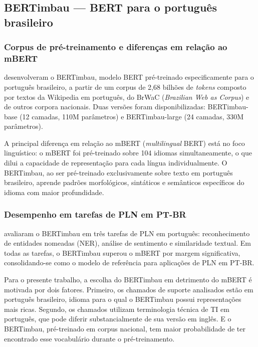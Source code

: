 \documentclass[
    12pt,                %
    openright,           %
    oneside,             %
    a4paper,             %
    english,             %
    brazil               %
]{abntex2}
\begin{document}
\subsection{BERTimbau — BERT para o português brasileiro}
\label{subsec:bertimbau}

\subsubsection{Corpus de pré-treinamento e diferenças em relação ao mBERT}
\label{subsubsec:bertimbau_corpus}

 desenvolveram o BERTimbau, modelo BERT pré-treinado especificamente para o português brasileiro, a partir de um corpus de 2,68 bilhões de \textit{tokens} composto por textos da Wikipedia em português, do BrWaC (\textit{Brazilian Web as Corpus}) e de outros corpora nacionais. Duas versões foram disponibilizadas: BERTimbau-base (12 camadas, 110M parâmetros) e BERTimbau-large (24 camadas, 330M parâmetros).

A principal diferença em relação ao mBERT (\textit{multilingual} BERT) está no foco linguístico: o mBERT foi pré-treinado sobre 104 idiomas simultaneamente, o que dilui a capacidade de representação para cada língua individualmente. O BERTimbau, ao ser pré-treinado exclusivamente sobre texto em português brasileiro, aprende padrões morfológicos, sintáticos e semânticos específicos do idioma com maior profundidade.

\subsubsection{Desempenho em tarefas de PLN em PT-BR}
\label{subsubsec:bertimbau_desempenho}

 avaliaram o BERTimbau em três tarefas de PLN em português: reconhecimento de entidades nomeadas (NER), análise de sentimento e similaridade textual. Em todas as tarefas, o BERTimbau superou o mBERT por margem significativa, consolidando-se como o modelo de referência para aplicações de PLN em PT-BR.

Para o presente trabalho, a escolha do BERTimbau em detrimento do mBERT é motivada por dois fatores. Primeiro, os chamados de suporte analisados estão em português brasileiro, idioma para o qual o BERTimbau possui representações mais ricas. Segundo, os chamados utilizam terminologia técnica de TI em português, que pode diferir substancialmente de sua versão em inglês. E o BERTimbau, pré-treinado em corpus nacional, tem maior probabilidade de ter encontrado esse vocabulário durante o pré-treinamento.
\end{document}
